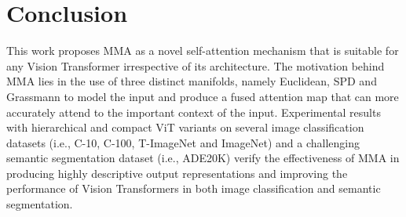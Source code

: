 \documentclass[10pt,twocolumn,letterpaper]{article}
\begin{document}
\section{Conclusion}
\label{sec:conclusion}
This work proposes MMA as a novel self-attention mechanism that is suitable for any Vision Transformer irrespective of its architecture. The motivation behind MMA lies in the use of three distinct manifolds, namely Euclidean, SPD and Grassmann to model the input and produce a fused attention map that can more accurately attend to the important context of the input. Experimental results with hierarchical and compact ViT variants on several image classification datasets (i.e., C-10, C-100, T-ImageNet and ImageNet) and a challenging semantic segmentation dataset (i.e., ADE20K) verify the effectiveness of MMA in producing highly descriptive output representations and improving the performance of Vision Transformers in both image classification and semantic segmentation.

























{\small


}
\end{document}
